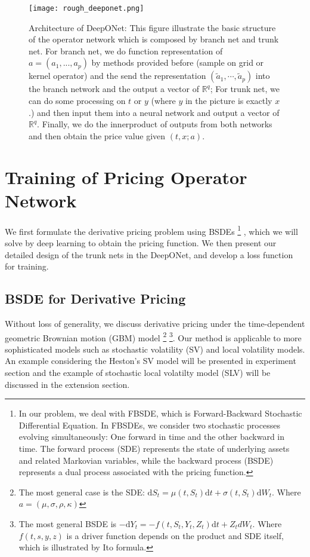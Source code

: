\documentclass[11pt,a4paper]{article}
\theoremstyle{remark}
\begin{document}
    \begin{figure}[htbp!]
    	\centering
    	\texttt{[image: rough\_deeponet.png]}
    	\caption{Architecture of DeepONet: This figure illustrate the basic structure of the operator network which is composed by branch net and trunk net. For branch net, we do function representation of $a = (a_1,...,a_p)$ by methods provided before (sample on grid or kernel operator) and the send the representation $ (\tilde{a}_1,\cdots,\tilde{a}_p)$ into the branch network and the output a vector of $\mathbb{R}^q$; For trunk net, we can do some processing on $t$ or $y$ (where $y$ in the picture is exactly $x$.) and then input them into a neural network and output a vector of $\mathbb{R}^q$. Finally, we do the innerproduct of outputs from both networks and then obtain the price value given $(t, x; a)$.}
    	\label{fig:deeponet}
    \end{figure}
   

	




	
	\section{Training of Pricing Operator Network}\label{sec:pricing}
	
	We first formulate the derivative pricing problem using BSDEs \footnote{In our problem, we deal with FBSDE, which is Forward-Backward Stochastic Differential Equation. In FBSDEs, we consider two stochastic processes evolving simultaneously: One forward in time and the other backward in time. The forward process (SDE) represents the state of underlying assets and related Markovian variables, while the backward process (BSDE) represents a dual process associated with the pricing function. } , which we will solve by deep learning to obtain the pricing function. We then present our detailed design of the trunk nets in the DeepONet, and develop a loss function for training.  
	
	\subsection{BSDE for Derivative Pricing}
	
	Without loss of generality, we discuss derivative pricing under the time-dependent geometric Brownian motion (GBM) model \footnote{The most general case is the SDE: $\mathrm{d} S_t  = \mu(t, S_t) \mathrm{d} t + \sigma(t, S_t) \mathrm{d} W_t$. Where $a = (\mu, \sigma, \rho, \kappa)$} \footnote{The most general BSDE is $-\mathrm{d} Y_t = -f(t, S_t, Y_t, Z_t) \mathrm{d} t + Z_t dW_t$. Where $f(t,s,y,z)$ is a driver function depends on the product and SDE itself, which is illustrated by Ito formula.}. Our method is applicable to more sophisticated models such as stochastic volatility (SV) and local volatility models. An example considering the Heston's SV model will be presented in experiment section and the example of stochastic local volatilty model (SLV) will be discussed in the extension section. 
	
\end{document}
